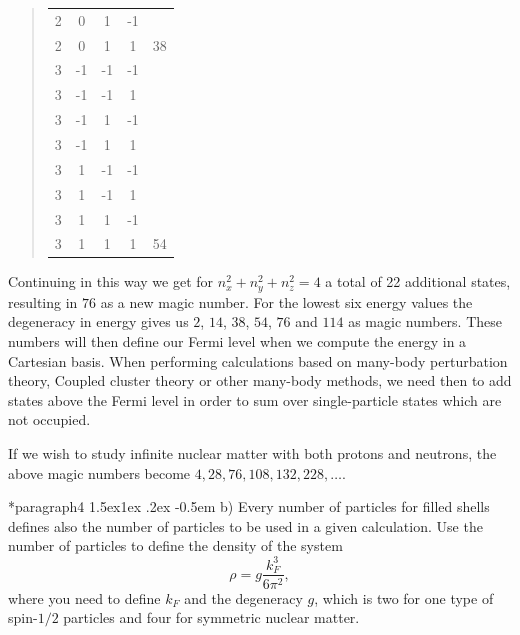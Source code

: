 \documentclass[%
oneside,                 %
final,                   %
10pt]{article}
\makeatletter
\newenvironment{doconceexercise}{}{}
\newcommand\subex{\@startsection*{paragraph}{4}{\z@}%
                  {1.5ex\@plus1ex \@minus.2ex}%
                  {-0.5em}%
                  {\normalfont\normalsize\bfseries}}
\makeatother
\begin{document}
\begin{doconceexercise}
\begin{quote}
\begin{tabular}{ccccc}
2                               & 0       & 1       & -1      &                            \\
2                               & 0       & 1       & 1       & 38                         \\
\hline
3                               & -1      & -1      & -1      &                            \\
3                               & -1      & -1      & 1       &                            \\
3                               & -1      & 1       & -1      &                            \\
3                               & -1      & 1       & 1       &                            \\
3                               & 1       & -1      & -1      &                            \\
3                               & 1       & -1      & 1       &                            \\
3                               & 1       & 1       & -1      &                            \\
3                               & 1       & 1       & 1       & 54                         \\
\hline
\end{tabular}
\end{quote}

\noindent
Continuing in this way we get for $n_{x}^{2}+n_{y}^{2}+n_{z}^{2}=4$  a total of 22 additional states, resulting in $76$ as a new magic number. For the lowest six energy values the degeneracy in energy gives us $2$, $14$, $38$, $54$, $76$ and $114$ as magic numbers. These numbers will then define our Fermi level when we compute the energy in a Cartesian basis. When performing calculations based on many-body perturbation theory, Coupled cluster theory or other many-body methods, we need then to add states above the Fermi level in order to sum over single-particle states which are not occupied.  

If we wish to study infinite nuclear matter with both protons and neutrons, the above magic numbers become $4, 28, 76, 108, 132, 228, \dots$.


\subex{b)}
Every number of particles for filled shells defines also the number of particles to be used in a given calculation. Use the number of particles to define  the density of the system 
\[
\rho = g \frac{k_F^3}{6\pi^2},
\]
where you need to define $k_F$ and the degeneracy $g$, which is two for one type of spin-$1/2$ particles and four for symmetric nuclear matter.


\end{doconceexercise}
\end{document}
